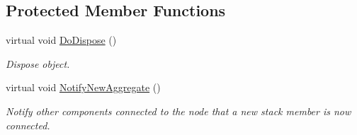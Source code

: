\subsection*{Protected Member Functions}
\begin{DoxyCompactItemize}
\item 
virtual void \hyperlink{classns3_1_1Ipv6L3Protocol_ae5d9eccbe1a381fa00d38400989551e4}{Do\+Dispose} ()
\begin{DoxyCompactList}\small\item\em Dispose object. \end{DoxyCompactList}\item 
virtual void \hyperlink{classns3_1_1Ipv6L3Protocol_ae07ff89952d068d18fb5650ffd1f5378}{Notify\+New\+Aggregate} ()
\begin{DoxyCompactList}\small\item\em Notify other components connected to the node that a new stack member is now connected. \end{DoxyCompactList}\end{DoxyCompactItemize}
